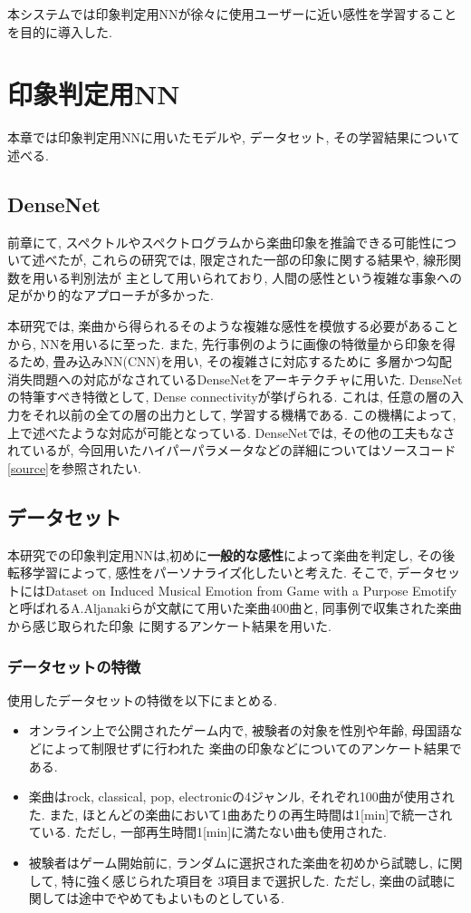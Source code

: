 \documentclass[a4paper,11pt,dvipdfmx]{jreport}
\begin{document}
本システムでは印象判定用NNが徐々に使用ユーザーに近い感性を学習することを目的に導入した.

\chapter{印象判定用NN}
本章では印象判定用NNに用いたモデルや, データセット, その学習結果について述べる.
\section{DenseNet}
前章にて, スペクトルやスペクトログラムから楽曲印象を推論できる可能性について述べたが, 
これらの研究\cite{Nagoya,Tokyo, Matsue}では, 限定された一部の印象に関する結果や, 線形関数を用いる判別法が
主として用いられており, 人間の感性という複雑な事象への足がかり的なアプローチが多かった.

本研究では, 楽曲から得られるそのような複雑な感性を模倣する必要があることから, NNを用いるに至った.
また, 先行事例のように画像の特徴量から印象を得るため, 畳み込みNN(CNN)を用い, その複雑さに対応するために
多層かつ勾配消失問題への対応がなされているDenseNet\cite{Dense}をアーキテクチャに用いた. 
DenseNetの特筆すべき特徴として, Dense connectivityが挙げられる.
これは, 任意の層の入力をそれ以前の全ての層の出力として, 学習する機構である.
この機構によって, 上で述べたような対応が可能となっている.
DenseNetでは, その他の工夫もなされているが, 今回用いたハイパーパラメータなどの詳細についてはソースコード\ref{source}を参照されたい.
\section{データセット}
本研究での印象判定用NNは,初めに\textbf{一般的な感性}によって楽曲を判定し, その後転移学習によって, 感性をパーソナライズ化したいと考えた.
そこで, データセットにはDataset on Induced Musical Emotion from Game with a Purpose Emotifyと呼ばれるA.Aljanakiらが文献\cite{game}にて用いた楽曲400曲と, 同事例で収集された楽曲から感じ取られた印象
に関するアンケート結果を用いた.
\subsection{データセットの特徴}
\label{traindata}
使用したデータセットの特徴を以下にまとめる.
\begin{itemize}
  \item オンライン上で公開されたゲーム内で, 被験者の対象を性別や年齢, 母国語などによって制限せずに行われた 
        楽曲の印象などについてのアンケート結果である.
  \item 楽曲はrock, classical, pop, electronicの4ジャンル, それぞれ100曲が使用された.
        また, ほとんどの楽曲において1曲あたりの再生時間は1[min]で統一されている. ただし, 一部再生時間1[min]に満たない曲も使用された.
  \item 被験者はゲーム開始前に, ランダムに選択された楽曲を初めから試聴し, に関して, 特に強く感じられた項目を
        3項目まで選択した. ただし, 楽曲の試聴に関しては途中でやめてもよいものとしている.
\end{itemize}
\end{document}
